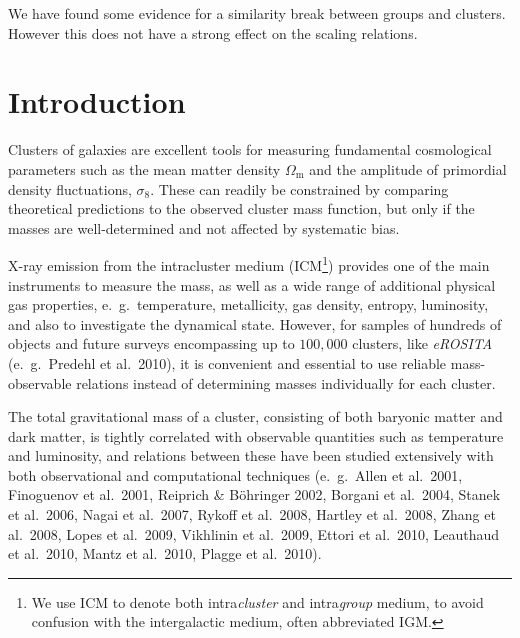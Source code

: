 \documentclass[structabstract]{aa}
\begin{document}
{We have found some evidence for a similarity break between groups and
  clusters. However this does not have a strong effect on the scaling relations.}
%
%
\maketitle
\renewcommand{\floatpagefraction}{0.6}
\section{Introduction}\label{sec:intro}
Clusters of galaxies are excellent tools for measuring fundamental
cosmological parameters such as the mean matter density $\Omega_{\text{m}}$ and the
amplitude of primordial density fluctuations, $\sigma_{8}$. These can readily
be constrained by comparing theoretical predictions to the observed cluster
mass function, but only if the masses are well-determined and not affected by
systematic bias.

X-ray emission from the intracluster medium (ICM\footnote{We use ICM
  to denote both intra\emph{cluster} and intra\emph{group} medium, to
  avoid confusion with the intergalactic medium, often abbreviated
  IGM.}) provides one of the main instruments to measure the mass, as
well as a wide range of additional physical gas properties, e.\ g.\
temperature, metallicity, gas density, entropy, luminosity, and also
to investigate the dynamical state. However, for samples of hundreds
of objects and future surveys encompassing up to $100,000$ clusters,
like \emph{eROSITA} (e.\ g.\ Predehl et al.\ 2010), it is convenient
and essential to use reliable mass-observable relations instead of
determining masses individually for each cluster.

The total gravitational mass of a cluster, consisting of both baryonic matter
and dark matter, is tightly correlated with observable quantities such as
temperature and luminosity, and relations between these have been studied
extensively with both observational and computational techniques
(e.\ g.\ Allen et al.\ 2001, Finoguenov et al.\ 2001, Reiprich \& B\"ohringer
2002, Borgani et al.\ 2004, Stanek et al.\ 2006, Nagai et al.\ 2007, Rykoff et
al.\ 2008, Hartley et al.\ 2008, Zhang et al.\ 2008, Lopes et al.\ 2009,
Vikhlinin et al.\ 2009, Ettori et al.\ 2010, Leauthaud et al.\ 2010, Mantz et
al.\ 2010, Plagge et al.\ 2010).
\end{document}
